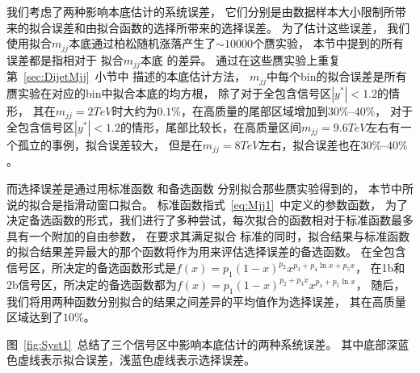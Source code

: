 我们考虑了两种影响本底估计的系统误差，
它们分别是由数据样本大小限制所带来的拟合误差和由拟合函数的选择所带来的选择误差。
为了估计这些误差，
我们使用拟合$m_{jj}$本底通过柏松随机涨落产生了$\sim 10000$个赝实验，
本节中提到的所有误差都是指相对于
拟合$m_{jj}$本底
的差异。
通过在这些赝实验上重复第~\ref{sec:DijetMjj}~小节中
描述的本底估计方法，
$m_{jj}$中每个bin的拟合误差是所有赝实验在对应的bin中拟合本底的均方根，
除了对于全包含信号区$|y^*|<1.2$的情形，
其在$m_{jj}=2TeV$时大约为$0.1\%$，在高质量的尾部区域增加到$30\%\text{--}40\%$，
对于全包含信号区$|y^*|<1.2$的情形，尾部比较长，在高质量区间$m_{jj}=9.6TeV$左右有一个孤立的事例，拟合误差较大，
但是在$m_{jj}=8TeV$左右，拟合误差也在$30\%\text{--}40\%$。

而选择误差是通过用标准函数
和备选函数
分别拟合那些赝实验得到的，
本节中所说的拟合是指滑动窗口拟合。
标准函数指式~\ref{eq:Mjj1}~中定义的参数函数，
为了决定备选函数的形式，我们进行了多种尝试，每次拟合的函数相对于标准函数最多具有一个附加的自由参数，
在要求其满足拟合
标准的同时，拟合结果与标准函数的拟合结果差异最大的那个函数将作为用来评估选择误差的备选函数。
在全包含信号区，所决定的备选函数形式是$f(x)=p_1(1-x)^{p_2}x^{p_3+p_4\ln x+p_5x}$，
在1b和2b信号区，所决定的备选函数都为$f(x)=p_1(1-x)^{p_2+p_3 x}x^{p_4 +p_5\ln x}$，
随后，
我们将用两种函数分别拟合的结果之间差异的平均值作为选择误差，
其在高质量区域达到了$10\%$。

图~\ref{fig:Syst1}~总结了三个信号区中影响本底估计的两种系统误差。
其中底部深蓝色虚线表示拟合误差，浅蓝色虚线表示选择误差。


